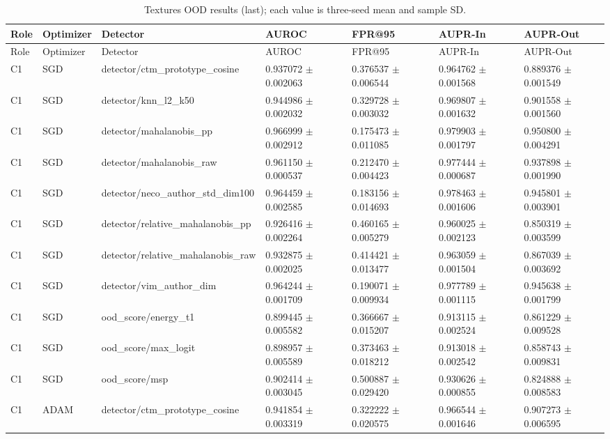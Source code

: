 \begin{longtable}{lllllll}
\caption{Textures OOD results (last); each value is three-seed mean and sample SD.}\\
Role & Optimizer & Detector & AUROC & FPR@95 & AUPR-In & AUPR-Out \\
\hline
\endfirsthead
Role & Optimizer & Detector & AUROC & FPR@95 & AUPR-In & AUPR-Out \\
\hline
\endhead
C1 & SGD & detector/ctm\_prototype\_cosine & 0.937072 $\pm$ 0.002063 & 0.376537 $\pm$ 0.006544 & 0.964762 $\pm$ 0.001568 & 0.889376 $\pm$ 0.001549 \\
C1 & SGD & detector/knn\_l2\_k50 & 0.944986 $\pm$ 0.002032 & 0.329728 $\pm$ 0.003032 & 0.969807 $\pm$ 0.001632 & 0.901558 $\pm$ 0.001560 \\
C1 & SGD & detector/mahalanobis\_pp & 0.966999 $\pm$ 0.002912 & 0.175473 $\pm$ 0.011085 & 0.979903 $\pm$ 0.001797 & 0.950800 $\pm$ 0.004291 \\
C1 & SGD & detector/mahalanobis\_raw & 0.961150 $\pm$ 0.000537 & 0.212470 $\pm$ 0.004423 & 0.977444 $\pm$ 0.000687 & 0.937898 $\pm$ 0.001990 \\
C1 & SGD & detector/neco\_author\_std\_dim100 & 0.964459 $\pm$ 0.002585 & 0.183156 $\pm$ 0.014693 & 0.978463 $\pm$ 0.001606 & 0.945801 $\pm$ 0.003901 \\
C1 & SGD & detector/relative\_mahalanobis\_pp & 0.926416 $\pm$ 0.002264 & 0.460165 $\pm$ 0.005279 & 0.960025 $\pm$ 0.002123 & 0.850319 $\pm$ 0.003599 \\
C1 & SGD & detector/relative\_mahalanobis\_raw & 0.932875 $\pm$ 0.002025 & 0.414421 $\pm$ 0.013477 & 0.963059 $\pm$ 0.001504 & 0.867039 $\pm$ 0.003692 \\
C1 & SGD & detector/vim\_author\_dim & 0.964244 $\pm$ 0.001709 & 0.190071 $\pm$ 0.009934 & 0.977789 $\pm$ 0.001115 & 0.945638 $\pm$ 0.001799 \\
C1 & SGD & ood\_score/energy\_t1 & 0.899445 $\pm$ 0.005582 & 0.366667 $\pm$ 0.015207 & 0.913115 $\pm$ 0.002524 & 0.861229 $\pm$ 0.009528 \\
C1 & SGD & ood\_score/max\_logit & 0.898957 $\pm$ 0.005589 & 0.373463 $\pm$ 0.018212 & 0.913018 $\pm$ 0.002542 & 0.858743 $\pm$ 0.009831 \\
C1 & SGD & ood\_score/msp & 0.902414 $\pm$ 0.003045 & 0.500887 $\pm$ 0.029420 & 0.930626 $\pm$ 0.000855 & 0.824888 $\pm$ 0.008583 \\
C1 & ADAM & detector/ctm\_prototype\_cosine & 0.941854 $\pm$ 0.003319 & 0.322222 $\pm$ 0.020575 & 0.966544 $\pm$ 0.001646 & 0.907273 $\pm$ 0.006595 \\

\end{longtable}
